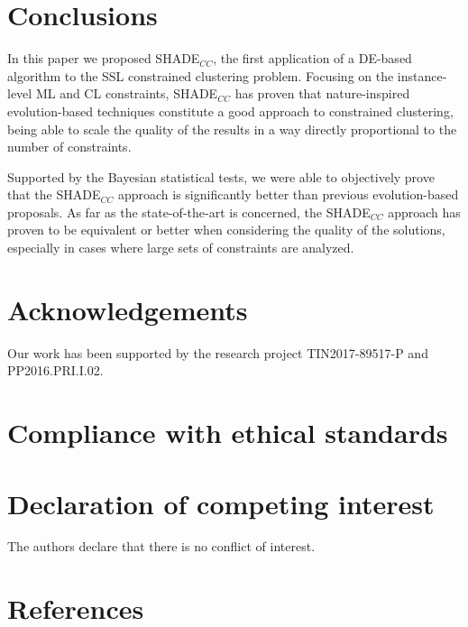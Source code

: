 \documentclass[review]{elsarticle}
\begin{document}
\section{Conclusions} \label{sec:conclusiones}

In this paper we proposed SHADE$_{CC}$, the first application of a DE-based algorithm to the SSL constrained clustering problem. Focusing on the instance-level ML and CL constraints, SHADE$_{CC}$ has proven that nature-inspired evolution-based techniques constitute a good approach to constrained clustering, being able to scale the quality of the results in a way directly proportional to the number of constraints.
 
Supported by the Bayesian statistical tests, we were able to objectively prove that the SHADE$_{CC}$ approach is significantly better than previous evolution-based proposals. As far as the state-of-the-art is concerned, the SHADE$_{CC}$ approach has proven to be equivalent or better when considering the quality of the solutions, especially in cases where large sets of constraints are analyzed.

\section*{Acknowledgements}

Our work has been supported by the research project TIN2017-89517-P and PP2016.PRI.I.02.

\section*{Compliance with ethical standards}

\section*{Declaration of competing interest}

The authors declare that there is no conflict of interest.

\clearpage

\section*{References}


\end{document}
